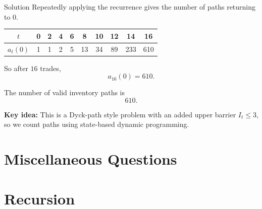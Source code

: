 \begin{frame}{Solution}
  Repeatedly applying the recurrence gives the number of paths returning to \(0\).

  \vspace{0.6em}

  \begin{center}
    \begin{tabular}{c|ccccccccc}
      \(t\) & 0 & 2 & 4 & 6 & 8 & 10 & 12 & 14 & 16 \\ \hline
      \(a_t(0)\) & 1 & 1 & 2 & 5 & 13 & 34 & 89 & 233 & 610
    \end{tabular}
  \end{center}

  \vspace{0.8em}

  So after \(16\) trades,
  \[
    a_{16}(0)=610.
  \]

  \vspace{0.6em}

  \begin{sqt:definition}
    The number of valid inventory paths is
    \[
      \boxed{610}.
    \]
  \end{sqt:definition}

  \vspace{0.5em}

  \textbf{Key idea:}
  This is a Dyck-path style problem with an added upper barrier \(I_t \le 3\),
  so we count paths using state-based dynamic programming.
\end{frame}

\section{Miscellaneous Questions}

\section{Recursion}

